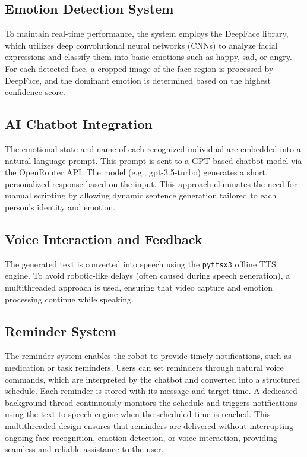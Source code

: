 \subsection{Emotion Detection System}
To maintain real-time performance, the system employs the DeepFace library, which utilizes deep convolutional neural networks (CNNs) to analyze facial expressions and classify them into basic emotions such as happy, sad, or angry. For each detected face, a cropped image of the face region is processed by DeepFace, and the dominant emotion is determined based on the highest confidence score.

\subsection{AI Chatbot Integration}
The emotional state and name of each recognized individual are embedded into a natural language prompt. This prompt is sent to a GPT-based chatbot model via the OpenRouter API. The model (e.g., gpt-3.5-turbo) generates a short, personalized response based on the input. This approach eliminates the need for manual scripting by allowing dynamic sentence generation tailored to each person’s identity and emotion.

\subsection{Voice Interaction and Feedback}
The generated text is converted into speech using the \texttt{pyttsx3} offline TTS engine. To avoid robotic-like delays (often caused during speech generation), a multithreaded approach is used, ensuring that video capture and emotion processing continue while speaking.

\subsection{ Reminder System}
The reminder system enables the robot to provide timely notifications, such as medication or task reminders. Users can set reminders through natural voice commands, which are interpreted by the chatbot and converted into a structured schedule. Each reminder is stored with its message and target time. A dedicated background thread continuously monitors the schedule and triggers notifications using the text-to-speech engine when the scheduled time is reached. This multithreaded design ensures that reminders are delivered without interrupting ongoing face recognition, emotion detection, or voice interaction, providing seamless and reliable assistance to the user.
